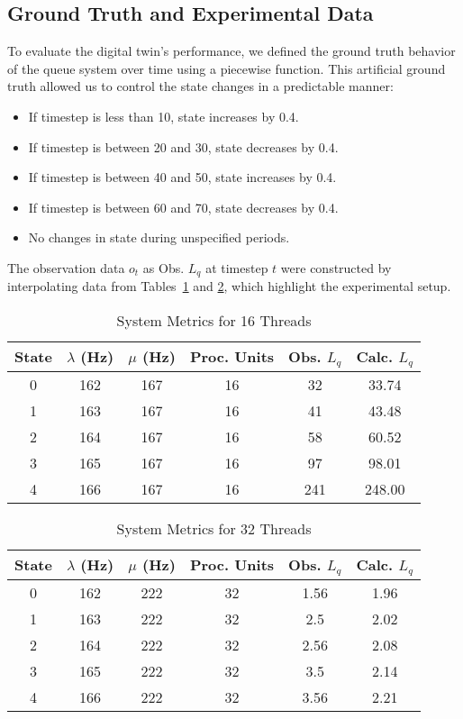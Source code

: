 \subsection{Ground Truth and Experimental Data}

To evaluate the digital twin's performance, we defined the ground truth behavior of the queue system over time using a piecewise function. This artificial ground truth allowed us to control the state changes in a predictable manner:

\begin{itemize}
    \item If timestep is less than 10, state increases by 0.4.
    \item If timestep is between 20 and 30, state decreases by 0.4.
    \item If timestep is between 40 and 50, state increases by 0.4.
    \item If timestep is between 60 and 70, state decreases by 0.4.
    \item No changes in state during unspecified periods.
\end{itemize}

The observation data \(o_t\) as Obs. \(L_q\) at timestep \(t\) were constructed by interpolating data from Tables~\ref{tab:16_threads_sec} and \ref{tab:32_threads_sec}, which highlight the experimental setup.

\begin{table}[htbp]
\caption{System Metrics for 16 Threads}
\centering
\small
\begin{tabular}{|c|c|c|c|c|c|}
\hline
State & \(\lambda\) (Hz) & \(\mu\) (Hz) & Proc. Units & Obs. \(L_q\) & Calc. \(L_q\) \\
\hline
0 & 162 & 167 & 16 & 32 & 33.74 \\
1 & 163 & 167 & 16 & 41 & 43.48 \\
2 & 164 & 167 & 16 & 58 & 60.52 \\
3 & 165 & 167 & 16 & 97 & 98.01 \\
4 & 166 & 167 & 16 & 241 & 248.00 \\
\hline
\end{tabular}
\label{tab:16_threads_sec}
\end{table}

\begin{table}[htbp]
\caption{System Metrics for 32 Threads}
\centering
\small
\begin{tabular}{|c|c|c|c|c|c|}
\hline
State & \(\lambda\) (Hz) & \(\mu\) (Hz) & Proc. Units & Obs. \(L_q\) & Calc. \(L_q\) \\
\hline
0 & 162 & 222 & 32 & 1.56 & 1.96 \\
1 & 163 & 222 & 32 & 2.5 & 2.02 \\
2 & 164 & 222 & 32 & 2.56 & 2.08 \\
3 & 165 & 222 & 32 & 3.5 & 2.14 \\
4 & 166 & 222 & 32 & 3.56 & 2.21 \\
\hline
\end{tabular}
\label{tab:32_threads_sec}
\end{table}

